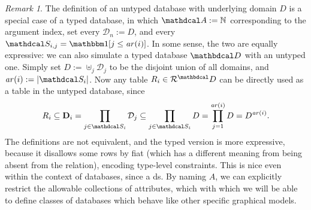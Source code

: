 \documentclass{article}
\theoremstyle{plain}
\theoremstyle{definition}
\theoremstyle{remark}
\newtheorem*{remark}{Remark}
\newcommand\mat[1]{\mathbf{#1}}
\newcommand{\D}{\mathbdcal D} %
\newcommand{\Attrs}{\mathdcal A}
\newcommand{\Doms}{{\mathcal D}}
\newcommand{\Rels}{{\mathcal R}}
\newcommand{\sch}{\mathdcal S}%
\newcommand{\arity}{\mathit{ar}}
\begin{document}
\begin{remark}\label{rem:typed-db-better}
    The definition of an untyped database with underlying domain $D$ is a special case of a typed database, in which $\Attrs := \mathbb N$ corresponding to the argument index, set every $\Doms_n := D $, and every $\sch_{i,j} = \mathbbm1[j \le \arity(i)]$. 
    In some sense, the two are equally expressive: we can also simulate a typed database $\D$ with an untyped one. Simply set $D := \uplus_j \mathcal D_j$ to be the disjoint union of all domains, and $\arity(i) := |\sch_i|$. Now any table $R_i \in \Rels^\D$ can be directly used as a table in the untyped database, since
    \[R_i \subseteq \mat D_i = \prod_{j \in \sch_i} \mathcal D_{j} 
		\subseteq \prod_{j \in \sch_i} D = \prod_{j = 1}^{\arity(i)} D = 
        D^{\arity(i)} .\] 
  	The definitions are not equivalent, and the typed version is more expressive, because it disallows some rows by fiat (which has a different meaning from being absent from the relation), encoding type-level constraints. This is nice even within the context of databases, since a ds. By naming $A$, we can explicitly restrict the  allowable collections of attributes, which with which we will be able to define classes of databases which behave like other specific graphical models.
\end{remark}
\end{document}
